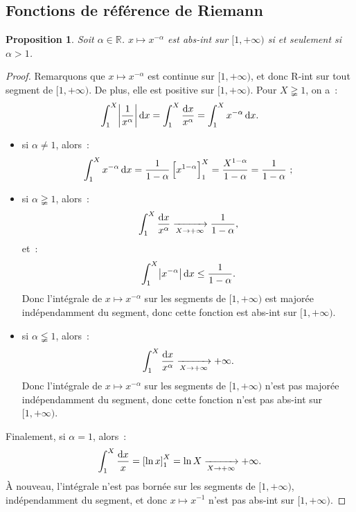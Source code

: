 \documentclass{report}
\newtheorem{prp}[thm]{Proposition}
\theoremstyle{definition}
\theoremstyle{remark}
\numberwithin{equation}{section}
\newcommand{\R}{\mathbb R}
\newcommand{\pinfty}{{+\infty}}
\begin{document}
		\subsection{Fonctions de référence de Riemann}
			\begin{prp} Soit $\alpha \in \R$. $x \mapsto x^{-\alpha}$ est abs-int sur $[1, \pinfty)$ si et seulement si $\alpha > 1$.
			\end{prp}

			\begin{proof} Remarquons que $x \mapsto x^{-\alpha}$ est continue sur $[1, \pinfty)$, et donc R-int sur tout segment de $[1, \pinfty)$. De plus,
			elle est positive sur $[1, \pinfty)$. Pour $X \gneqq 1$, on a~:
			\begin{equation}
				\int_1^X\abs {\frac 1{x^\alpha}}\dif x = \int_1^X \frac {\dif x}{x^\alpha} = \int_1^Xx^{-\alpha}\dif x.
			\end{equation}
			\begin{itemize}
				\item si $\alpha \neq 1$, alors~:
				\begin{equation}
					\int_1^Xx^{-\alpha}\dif x = \frac 1{1-\alpha}\left[x^{1-\alpha}\right]_1^X = \frac {X^{1-\alpha}}{1-\alpha} = \frac 1{1-\alpha}~;
				\end{equation}
				\item si $\alpha \gneqq 1$, alors~:
				\begin{equation}
					\int_1^X\frac {\dif x}{x^\alpha} \xrightarrow[X \to \pinfty]{} \frac 1{1-\alpha},
				\end{equation}
				et~:
				\begin{equation}
					\int_1^X\abs {x^{-\alpha}}\dif x \leq \frac 1{1-\alpha}.
				\end{equation}
				Donc l'intégrale de $x \mapsto x^{-\alpha}$ sur les segments de $[1, \pinfty)$ est majorée indépendamment du segment, donc cette fonction est abs-int sur
				$[1, \pinfty)$.
				\item si $\alpha \lneqq 1$, alors~:
				\begin{equation}
					\int_1^X \frac {\dif x}{x^\alpha} \xrightarrow[X \to \pinfty]{} \pinfty.
				\end{equation}
				Donc l'intégrale de $x \mapsto x^{-\alpha}$ sur les segments de $[1, \pinfty)$ n'est pas majorée indépendamment du segment, donc cette fonction n'est pas
				abs-int sur $[1, \pinfty)$.
			\end{itemize}

			Finalement, si $\alpha = 1$, alors~:
			\begin{equation}
				\int_1^X\frac {\dif x}x = \left[\ln x\right]_1^X = \ln X \xrightarrow[X \to \pinfty]{} \pinfty.
			\end{equation}
			À nouveau, l'intégrale n'est pas bornée sur les segments de $[1, \pinfty)$, indépendamment du segment, et donc $x \mapsto x^{-1}$ n'est pas abs-int sur
			$[1, \pinfty)$.
			\end{proof}
\end{document}
